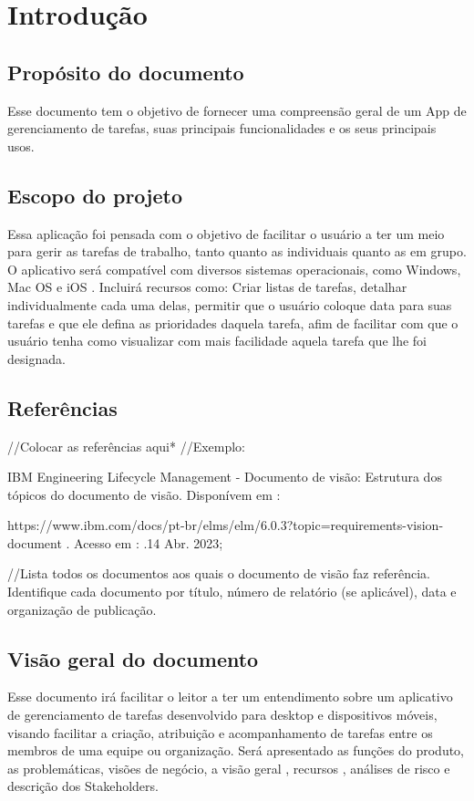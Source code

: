 \chapter{Introdução}
\section{Propósito do documento}
Esse documento tem o objetivo de fornecer uma compreensão geral de um App de gerenciamento de tarefas, suas principais funcionalidades e os seus principais usos.
\section{Escopo do projeto}
Essa aplicação foi pensada com o objetivo de facilitar o usuário a ter um meio para gerir as tarefas de trabalho, tanto quanto as individuais quanto as em grupo. O aplicativo será compatível com diversos sistemas operacionais, como Windows, Mac OS e iOS . Incluirá recursos como: Criar listas de tarefas, detalhar individualmente cada uma delas, permitir que o usuário coloque data para suas tarefas e que ele defina as prioridades daquela tarefa, afim de facilitar com que o usuário tenha como visualizar com mais facilidade aquela tarefa que lhe foi designada.
\section{Referências}
//Colocar as referências aqui*
//Exemplo:

IBM Engineering Lifecycle Management - Documento de visão: Estrutura dos tópicos do documento de visão.
Disponívem em : 

https://www.ibm.com/docs/pt-br/elms/elm/6.0.3?topic=requirements-vision-document . Acesso em : .14 Abr. 2023;

//Lista todos os documentos aos quais o documento de visão faz referência. Identifique cada documento por título, número de relatório (se aplicável), data e organização de publicação.
\section{Visão geral do documento}
Esse documento irá facilitar o leitor a ter um entendimento sobre um aplicativo de gerenciamento de tarefas desenvolvido para desktop e dispositivos móveis, visando facilitar a criação, atribuição e acompanhamento de tarefas entre os membros de uma equipe ou organização. Será apresentado as funções do produto, as problemáticas, visões de negócio, a visão geral , recursos , análises de risco e descrição dos Stakeholders.
